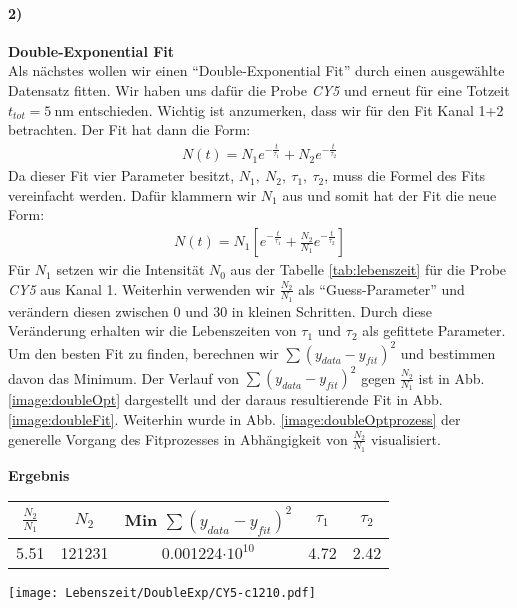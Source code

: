 \paragraph{2)}\textbf{Double-Exponential Fit}\\
Als nächstes wollen wir einen \enquote{Double-Exponential Fit} durch einen ausgewählte Datensatz fitten. Wir haben uns dafür die Probe \textit{CY5} und erneut für eine Totzeit $t_{tot}=\SI{5}{\nano\metre}$ entschieden. Wichtig ist anzumerken, dass wir für den Fit Kanal 1+2 betrachten. Der Fit hat dann die Form:
\begin{gather}
    N(t) = N_1e^{-\frac{t}{\tau_1}} + N_2e^{-\frac{t}{\tau_2}}
\end{gather}
Da dieser Fit vier Parameter besitzt, $N_1,~N_2,~\tau_1,~\tau_2$, muss die Formel des Fits vereinfacht werden. Dafür klammern wir $N_1$ aus und somit hat der Fit die neue Form:
\begin{gather}
    N(t) = N_1\left[e^{-\frac{t}{\tau_1}} + \frac{N_2}{N_1}e^{-\frac{t}{\tau_2}}\right]
\end{gather}
Für $N_1$ setzen wir die Intensität $N_0$ aus der Tabelle \ref{tab:lebenszeit} für die Probe \textit{CY5} aus Kanal 1. Weiterhin verwenden wir $\frac{N_2}{N_1}$ als \enquote{Guess-Parameter} und verändern diesen zwischen 0 und 30 in kleinen Schritten. Durch diese Veränderung erhalten wir die Lebenszeiten von $\tau_1$ und $\tau_2$ als gefittete Parameter. Um den besten Fit zu finden, berechnen wir $\sum(y_{data}-y_{fit})^2$ und bestimmen davon das Minimum. Der Verlauf von $\sum(y_{data}-y_{fit})^2$ gegen $\frac{N_2}{N_1}$ ist in Abb. \ref{image:doubleOpt} dargestellt und der daraus resultierende Fit in Abb. \ref{image:doubleFit}. Weiterhin wurde in Abb. \ref{image:doubleOptprozess} der generelle Vorgang des Fitprozesses in Abhängigkeit von $\frac{N_2}{N_1}$ visualisiert.
\begin{center}
    \textbf{Ergebnis}\\[0,2cm]
    \begin{tabular}{c c | c c c}
        $\frac{N_2}{N_1}$ & $N_2$ & Min $\sum(y_{data}-y_{fit})^2$ & $\tau_1$ & $\tau_2$ \\
        \hline
        5.51 & 121231 & 0.001224$\cdot10^{10}$ & 4.72 & 2.42 \\
    \end{tabular}
\end{center}
\begin{center}
    \texttt{[image: Lebenszeit/DoubleExp/CY5-c1210.pdf]}
    \label{image:doubleFit}
\end{center}
